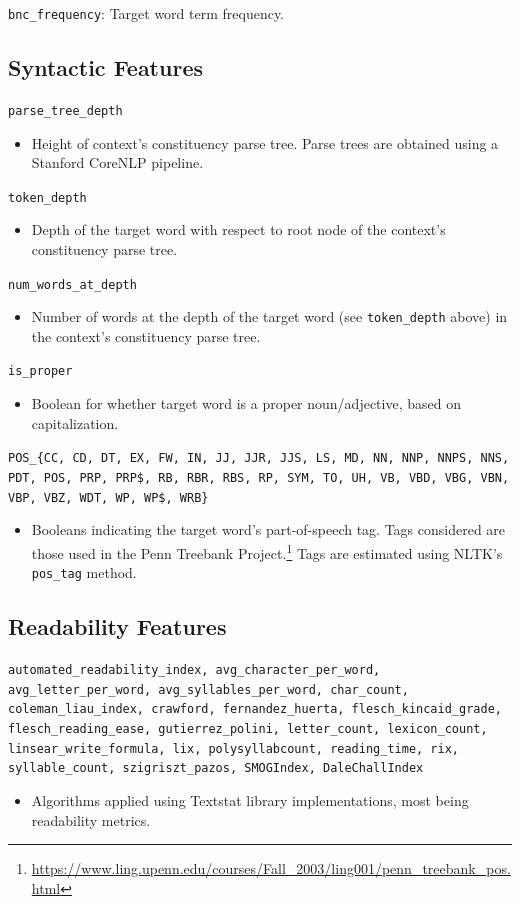 \documentclass[11pt,a4paper]{article}
\begin{document}
\texttt{bnc\_frequency}: Target word term frequency.

\subsection{Syntactic Features}

\texttt{parse\_tree\_depth}
\begin{itemize}
  \item Height of context's constituency parse tree. Parse trees are obtained using a Stanford CoreNLP pipeline.
\end{itemize}
\texttt{token\_depth}
\begin{itemize}
  \item Depth of the target word with respect to root node of the context's constituency parse tree.
\end{itemize}
\texttt{num\_words\_at\_depth}
\begin{itemize}
  \item Number of words at the depth of the target word (see \texttt{token\_depth} above) in the context's constituency parse tree.
\end{itemize}
\texttt{is\_proper}
\begin{itemize}
  \item Boolean for whether target word is a proper noun/adjective, based on capitalization.
\end{itemize}
\texttt{POS\_\{CC, CD, DT, EX, FW, IN, JJ, JJR, JJS, LS, MD, NN, NNP, NNPS, NNS, PDT, POS, PRP, PRP\$, RB, RBR, RBS, RP, SYM, TO, UH, VB, VBD, VBG, VBN, VBP, VBZ, WDT, WP, WP\$, WRB\}}
\begin{itemize}
  \item Booleans indicating the target word's part-of-speech tag. Tags considered are those used in the Penn Treebank Project.\footnote{\url{https://www.ling.upenn.edu/courses/Fall_2003/ling001/penn_treebank_pos.html}} Tags are estimated using NLTK's \texttt{pos\_tag} method.
\end{itemize}

\subsection{Readability Features}

\texttt{automated\_readability\_index, avg\_character\_per\_word, avg\_letter\_per\_word, avg\_syllables\_per\_word, char\_count, coleman\_liau\_index, crawford, fernandez\_huerta, flesch\_kincaid\_grade, flesch\_reading\_ease, gutierrez\_polini, letter\_count, lexicon\_count, linsear\_write\_formula, lix, polysyllabcount, reading\_time, rix, syllable\_count, szigriszt\_pazos, SMOGIndex, DaleChallIndex}
\begin{itemize}
  \item Algorithms applied using Textstat library implementations, most being readability metrics.
\end{itemize}
\end{document}
